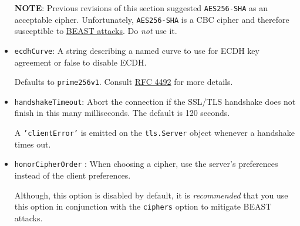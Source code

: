 \begin{itemize}
  \textbf{NOTE}: Previous revisions of this section suggested
  \texttt{AES256-SHA} as an acceptable cipher. Unfortunately,
  \texttt{AES256-SHA} is a CBC cipher and therefore susceptible to
  \href{http://blog.ivanristic.com/2011/10/mitigating-the-beast-attack-on-tls.html}{BEAST
  attacks}. Do \emph{not} use it.
\item
  \texttt{ecdhCurve}: A string describing a named curve to use for ECDH
  key agreement or false to disable ECDH.

  Defaults to \texttt{prime256v1}. Consult
  \href{http://www.rfc-editor.org/rfc/rfc4492.txt}{RFC 4492} for more
  details.
\item
  \texttt{handshakeTimeout}: Abort the connection if the SSL/TLS
  handshake does not finish in this many milliseconds. The default is
  120 seconds.

  A \texttt{'clientError'} is emitted on the \texttt{tls.Server} object
  whenever a handshake times out.
\item
  \texttt{honorCipherOrder} : When choosing a cipher, use the server's
  preferences instead of the client preferences.

  Although, this option is disabled by default, it is \emph{recommended}
  that you use this option in conjunction with the \texttt{ciphers}
  option to mitigate BEAST attacks.


\end{itemize}
